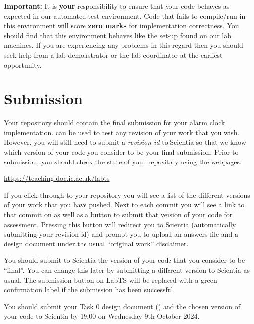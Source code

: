 \documentclass[a4paper,11pt]{article}
\begin{document}
{\bf Important:} It is {\bf your} responsibility to ensure that your code behaves as expected in our automated test environment. 
Code that fails to compile/run in this environment will score {\bf zero marks} for implementation correctness.
You should find that this environment behaves like the set-up found on our lab machines.
If you are experiencing any problems in this regard then you should seek help from a lab demonstrator or the lab coordinator at the earliest opportunity.


\section*{Submission}
Your  repository should contain the final submission for your alarm clock implementation.
 can be used to test any revision of your work that you wish.
However, you will still need to submit a \emph{revision id} to Scientia so that we know which version of your code you consider to be your final submission. 
Prior to submission, you should check the state of your  repository using the  webpages:

\url{https://teaching.doc.ic.ac.uk/labts}

\noindent If you click through to your  repository you will see a list of the different versions of your work that you have pushed.
Next to each commit you will see a link to that commit on  as well as a button to submit that version of your code for assessment.
Pressing this button will redirect you to Scientia (automatically submitting your revision id)
and prompt you to upload an answers file and a design document under the usual ``original work'' disclaimer.

You should submit to Scientia the version of your code that you consider to be ``final''.
You can change this later by submitting a different version to Scientia as usual.
The submission button on LabTS will be replaced with a green confirmation label if the submission has been successful.

You should submit your Task 0 design document () and the chosen version of your code to Scientia by 19:00 on Wednesday 9th October 2024.\\


\end{document}

